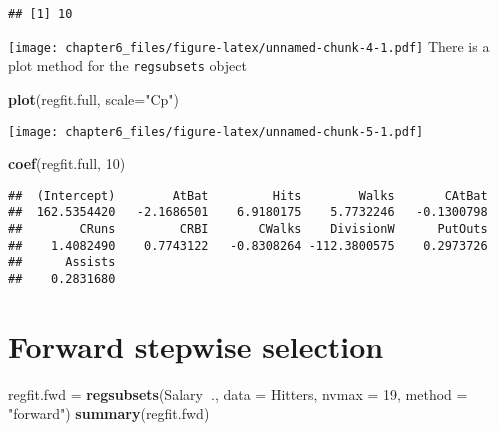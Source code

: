 \documentclass[]{article}
\newenvironment{Shaded}{\begin{snugshade}}{\end{snugshade}}
\newcommand{\KeywordTok}[1]{\textcolor[rgb]{0.13,0.29,0.53}{\textbf{#1}}}
\newcommand{\DataTypeTok}[1]{\textcolor[rgb]{0.13,0.29,0.53}{#1}}
\newcommand{\DecValTok}[1]{\textcolor[rgb]{0.00,0.00,0.81}{#1}}
\newcommand{\StringTok}[1]{\textcolor[rgb]{0.31,0.60,0.02}{#1}}
\newcommand{\OperatorTok}[1]{\textcolor[rgb]{0.81,0.36,0.00}{\textbf{#1}}}
\newcommand{\NormalTok}[1]{#1}
\begin{document}
\begin{verbatim}
## [1] 10
\end{verbatim}

\begin{Shaded}
\end{Shaded}

\texttt{[image: chapter6\_files/figure-latex/unnamed-chunk-4-1.pdf]}
There is a plot method for the \texttt{regsubsets} object

\begin{Shaded}
\begin{Highlighting}[]
\KeywordTok{plot}\NormalTok{(regfit.full, }\DataTypeTok{scale=}\StringTok{"Cp"}\NormalTok{)}
\end{Highlighting}
\end{Shaded}

\texttt{[image: chapter6\_files/figure-latex/unnamed-chunk-5-1.pdf]}

\begin{Shaded}
\begin{Highlighting}[]
\KeywordTok{coef}\NormalTok{(regfit.full, }\DecValTok{10}\NormalTok{)}
\end{Highlighting}
\end{Shaded}

\begin{verbatim}
##  (Intercept)        AtBat         Hits        Walks       CAtBat 
##  162.5354420   -2.1686501    6.9180175    5.7732246   -0.1300798 
##        CRuns         CRBI       CWalks    DivisionW      PutOuts 
##    1.4082490    0.7743122   -0.8308264 -112.3800575    0.2973726 
##      Assists 
##    0.2831680
\end{verbatim}

\section{Forward stepwise selection}\label{forward-stepwise-selection}

\begin{Shaded}
\begin{Highlighting}[]
\NormalTok{regfit.fwd =}\StringTok{ }\KeywordTok{regsubsets}\NormalTok{(Salary}\OperatorTok{~}\NormalTok{., }\DataTypeTok{data =}\NormalTok{ Hitters, }\DataTypeTok{nvmax =} \DecValTok{19}\NormalTok{, }\DataTypeTok{method =} \StringTok{"forward"}\NormalTok{)}
\KeywordTok{summary}\NormalTok{(regfit.fwd)}
\end{Highlighting}
\end{Shaded}
\end{document}
